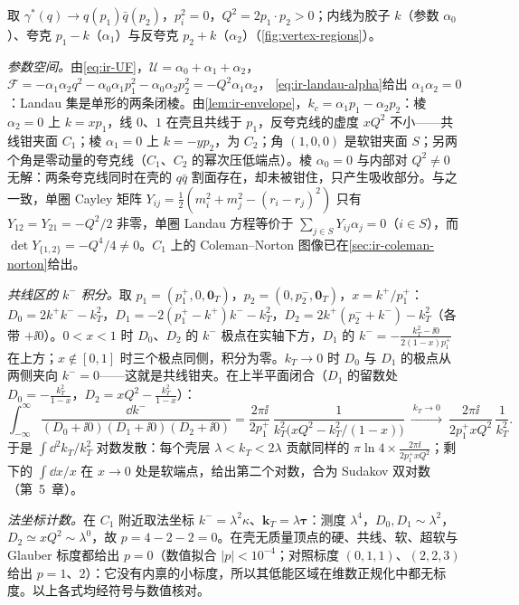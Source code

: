 \begin{example}[单圈无质量顶点]\label{ex:ir-vertex}
取 $\gamma^*(q)\to q(p_1)\bar q(p_2)$，$p_i^2=0$，$Q^2=2p_1\cdot p_2>0$；内线为胶子 $k$（参数 $\alpha_0$）、夸克 $p_1-k$（$\alpha_1$）与反夸克 $p_2+k$（$\alpha_2$）（\cref{fig:vertex-regions}）。

\emph{参数空间。}由\cref{eq:ir-UF}，$\mathcal U=\alpha_0+\alpha_1+\alpha_2$，$\mathcal F=-\alpha_1\alpha_2q^2-\alpha_0\alpha_1p_1^2-\alpha_0\alpha_2p_2^2=-Q^2\alpha_1\alpha_2$，
\cref{eq:ir-landau-alpha}给出 $\alpha_1\alpha_2=0$：Landau 集是单形的两条闭棱。由\cref{lem:ir-envelope}，$k_c=\alpha_1p_1-\alpha_2p_2$：棱 $\alpha_2=0$ 上 $k=xp_1$，线 $0$、$1$ 在壳且共线于 $p_1$，反夸克线的虚度 $xQ^2$ 不小——共线钳夹面 $C_1$；棱 $\alpha_1=0$ 上 $k=-yp_2$，为 $C_2$；角 $(1,0,0)$ 是软钳夹面 $S$；另两个角是零动量的夸克线（$C_1$、$C_2$ 的幂次压低端点）。棱 $\alpha_0=0$ 与内部对 $Q^2\ne0$ 无解：两条夸克线同时在壳的 $q\bar q$ 割面存在，却未被钳住，只产生吸收部分。与之一致，单圈 Cayley 矩阵 $Y_{ij}=\frac12(m_i^2+m_j^2-(r_i-r_j)^2)$ 只有 $Y_{12}=Y_{21}=-Q^2/2$ 非零，单圈 Landau 方程等价于 $\sum_{j\in S}Y_{ij}\alpha_j=0$（$i\in S$），而 $\det Y_{\{1,2\}}=-Q^4/4\ne0$。$C_1$ 上的 Coleman--Norton 图像已在\cref{sec:ir-coleman-norton}给出。

\emph{共线区的 $k^-$ 积分。}取 $p_1=(p_1^+,0,\mathbf 0_T)$，$p_2=(0,p_2^-,\mathbf 0_T)$，$x=k^+/p_1^+$：$D_0=2k^+k^--k_T^2$，$D_1=-2(p_1^+-k^+)k^--k_T^2$，$D_2=2k^+(p_2^-+k^-)-k_T^2$（各带 $+\ii0$）。$0<x<1$ 时 $D_0$、$D_2$ 的 $k^-$ 极点在实轴下方，$D_1$ 的 $k^-=-\frac{k_T^2-\ii0}{2(1-x)p_1^+}$ 在上方；$x\notin[0,1]$ 时三个极点同侧，积分为零。$k_T\to0$ 时 $D_0$ 与 $D_1$ 的极点从两侧夹向 $k^-=0$——这就是共线钳夹。在上半平面闭合（$D_1$ 的留数处 $D_0=-\frac{k_T^2}{1-x}$，$D_2=xQ^2-\frac{k_T^2}{1-x}$）：
\begin{equation}\label{eq:ir-vertex-kminus}
\int_{-\infty}^{\infty}\frac{\dd k^-}{(D_0+\ii0)(D_1+\ii0)(D_2+\ii0)}=\frac{2\pi\ii}{2p_1^+}\,\frac{1}{k_T^2\big(xQ^2-k_T^2/(1-x)\big)}\ \xrightarrow{\ k_T\to0\ }\ \frac{2\pi\ii}{2p_1^+xQ^2}\,\frac{1}{k_T^2} .
\end{equation}
于是 $\int\dd^2k_T/k_T^2$ 对数发散：每个壳层 $\lambda<k_T<2\lambda$ 贡献同样的 $\pi\ln4\times\frac{2\pi\ii}{2p_1^+xQ^2}$；剩下的 $\int\dd x/x$ 在 $x\to0$ 处是软端点，给出第二个对数，合为 Sudakov 双对数（第~5~章）。

\emph{法坐标计数。}在 $C_1$ 附近取法坐标 $k^-=\lambda^2\kappa$、$\mathbf k_T=\lambda\boldsymbol\tau$：测度 $\lambda^4$，$D_0,D_1\sim\lambda^2$，$D_2\simeq xQ^2\sim\lambda^0$，故 $p=4-2-2=0$。在壳无质量顶点的硬、共线、软、超软与 Glauber 标度都给出 $p=0$（数值拟合 $|p|<10^{-4}$；对照标度 $(0,1,1)$、$(2,2,3)$ 给出 $p=1$、$2$）：它没有内禀的小标度，所以其低能区域在维数正规化中都无标度。以上各式均经符号与数值核对。
\end{example}

